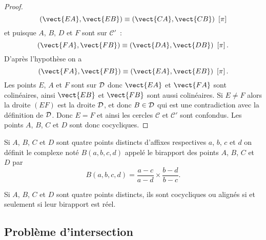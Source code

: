 \begin{proof}
\begin{equation}
  \congru{(\vect{EA},\vect{EB})}{(\vect{CA},\vect{CB})}{\pi}  
\end{equation}
et puisque $A$, $B$, $D$ et $F$ sont sur $\mathcal{C}'$~:
\begin{equation}
  \congru{(\vect{FA},\vect{FB})}{(\vect{DA},\vect{DB})}{\pi}.
\end{equation}
D'après l'hypothèse on a 
\begin{equation}
\congru{(\vect{FA},\vect{FB})}{(\vect{EA},\vect{EB})}{\pi}.
\end{equation}
Les points $E$, $A$ et $F$ sont sur $\mathcal{D}$ donc $\vect{EA}$ et $\vect{FA}$ sont colinéaires, ainsi $\vect{EB}$ et $\vect{FB}$ sont aussi colinéaires. Si $E \neq F$ alors la droite $(EF)$ est la droite $\mathcal{D}$, et donc $B \in \mathcal{D}$ qui est une contradiction avec la définition de $\mathcal{D}$. Donc $E=F$ et ainsi les cercles $\mathcal{C}$ et $\mathcal{C}'$ sont confondus. Les points $A$, $B$, $C$ et $D$ sont donc cocycliques.
\end{proof}
\begin{defdef}
  Si $A$, $B$, $C$ et $D$ sont quatre points distincts d'affixes respectives $a$, $b$, $c$ et $d$ on définit le complexe noté $B(a,b,c,d)$ appelé le birapport des points $A$, $B$, $C$ et $D$ par
  \begin{equation}
    B(a,b,c,d)=\frac{a-c}{a-d} \times \frac{b-d}{b-c}.
  \end{equation}
\end{defdef}
\begin{theo}
  Si $A$, $B$, $C$ et $D$ sont quatre points distincts, ils sont cocycliques ou alignés si et seulement si leur birapport est réel.
\end{theo}

\subsection{Problème d'intersection}
